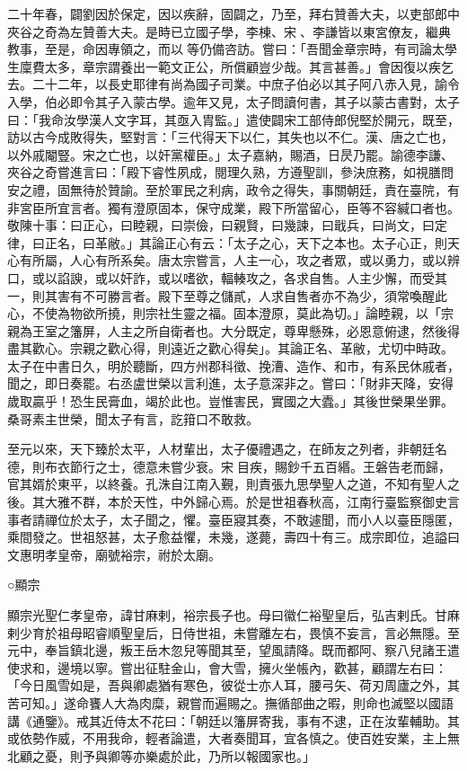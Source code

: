 \begin{pinyinscope}
 二十年春，闢劉因於保定，因以疾辭，固闢之，乃至，拜右贊善大夫，以吏部郎中夾谷之奇為左贊善大夫。是時已立國子學，李棟、宋、李謙皆以東宮僚友，繼典教事，至是，命因專領之，而以等仍備咨訪。嘗曰：「吾聞金章宗時，有司論太學生廩費太多，章宗謂養出一範文正公，所償顧豈少哉。其言甚善。」會因復以疾乞去。二十二年，以長史耶律有尚為國子司業。中庶子伯必以其子阿八赤入見，諭令入學，伯必即令其子入蒙古學。逾年又見，太子問讀何書，其子以蒙古書對，太子曰：「我命汝學漢人文字耳，其亟入胄監。」遣使闢宋工部侍郎倪堅於開元，既至，訪以古今成敗得失，堅對言：「三代得天下以仁，其失也以不仁。漢、唐之亡也，以外戚閹豎。宋之亡也，以奸黨權臣。」太子嘉納，賜酒，日昃乃罷。諭德李謙、夾谷之奇嘗進言曰：「殿下睿性夙成，閱理久熟，方遵聖訓，參決庶務，如視膳問安之禮，固無待於贊諭。至於軍民之利病，政令之得失，事關朝廷，責在臺院，有非宮臣所宜言者。獨有澄原固本，保守成業，殿下所當留心，臣等不容緘口者也。敬陳十事：曰正心，曰睦親，曰崇儉，曰親賢，曰幾諫，曰戢兵，曰尚文，曰定律，曰正名，曰革敝。」其論正心有云：「太子之心，天下之本也。太子心正，則天心有所屬，人心有所系矣。唐太宗嘗言，人主一心，攻之者眾，或以勇力，或以辨口，或以諂諛，或以奸詐，或以嗜欲，輻輳攻之，各求自售。人主少懈，而受其一，則其害有不可勝言者。殿下至尊之儲貳，人求自售者亦不為少，須常喚醒此心，不使為物欲所撓，則宗社生靈之福。固本澄原，莫此為切。」論睦親，以「宗親為王室之籓屏，人主之所自衛者也。大分既定，尊卑懸殊，必恩意俯逮，然後得盡其歡心。宗親之歡心得，則遠近之歡心得矣」。其論正名、革敝，尤切中時政。太子在中書日久，明於聽斷，四方州郡科徵、挽漕、造作、和市，有系民休戚者，聞之，即日奏罷。右丞盧世榮以言利進，太子意深非之。嘗曰：「財非天降，安得歲取贏乎！恐生民膏血，竭於此也。豈惟害民，實國之大蠹。」其後世榮果坐罪。桑哥素主世榮，聞太子有言，訖箝口不敢救。



 至元以來，天下臻於太平，人材輩出，太子優禮遇之，在師友之列者，非朝廷名德，則布衣節行之士，德意未嘗少衰。宋目疾，賜鈔千五百緡。王磐告老而歸，官其婿於東平，以終養。孔洙自江南入覲，則責張九思學聖人之道，不知有聖人之後。其大雅不群，本於天性，中外歸心焉。於是世祖春秋高，江南行臺監察御史言事者請禪位於太子，太子聞之，懼。臺臣寢其奏，不敢遽聞，而小人以臺臣隱匿，乘間發之。世祖怒甚，太子愈益懼，未幾，遂薨，壽四十有三。成宗即位，追謚曰文惠明孝皇帝，廟號裕宗，祔於太廟。



 ○顯宗



 顯宗光聖仁孝皇帝，諱甘麻剌，裕宗長子也。母曰徽仁裕聖皇后，弘吉剌氏。甘麻剌少育於祖母昭睿順聖皇后，日侍世祖，未嘗離左右，畏慎不妄言，言必無隱。至元中，奉旨鎮北邊，叛王岳木忽兒等聞其至，望風請降。既而都阿、察八兒諸王遣使求和，邊境以寧。嘗出征駐金山，會大雪，擁火坐帳內，歡甚，顧謂左右曰：「今日風雪如是，吾與卿處猶有寒色，彼從士亦人耳，腰弓矢、荷刃周廬之外，其苦可知。」遂命饔人大為肉糜，親嘗而遍賜之。撫循部曲之暇，則命也滅堅以國語講《通鑒》。戒其近侍太不花曰：「朝廷以籓屏寄我，事有不逮，正在汝輩輔助。其或依勢作威，不用我命，輕者論遣，大者奏聞耳，宜各慎之。使百姓安業，主上無北顧之憂，則予與卿等亦樂處於此，乃所以報國家也。」




\end{pinyinscope}
